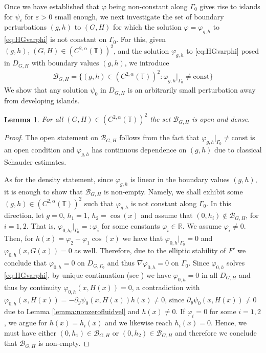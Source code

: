 \documentclass[11pt,reqno]{amsproc}
\newcommand{\R}{\mathbb{R}}
\newcommand{\ve}{\varepsilon}
\numberwithin{equation}{section}
\numberwithin{theorem}{section}
\numberwithin{prop}{section}
\numberwithin{cor}{section}
\newtheorem{lemma}{Lemma}
\numberwithin{lemma}{section}
\theoremstyle{remark}
\theoremstyle{definition}
\begin{document}
Once we have established that $\varphi$ being non-constant along $\Gamma_0$ gives rise to islands for $\psi_\ve$ for $\ve>0$ small enough, we next investigate the set of boundary perturbations $(g,h)$ to $(G,H)$ for which the solution $\varphi=\varphi_{g,h}$ to \eqref{eq:HGvarphi} is not constant on $\Gamma_0$. For this, given $(g,h),\, (G,H)\in (C^{2,\alpha}(\mathbb{T}))^2$, and the solution $\varphi_{g,h}$ to \eqref{eq:HGvarphi} posed in $D_{G,H}$ with boundary values $(g,h)$, we introduce
\begin{align*}
\mathcal{B}_{G,H} = \lbrace (g,h)\in (C^{2,\alpha}(\mathbb{T}))^2 : \varphi_{g,h}|_{\Gamma_0}\neq \text{const}\rbrace
\end{align*}
We show that any solution $\psi_0$ in $D_{G,H}$ is an arbitrarily small perturbation away from developing islands.

\begin{lemma}\label{lemma:BGHdense}
For all $(G,H)\in (C^{2,\alpha}(\mathbb{T}))^2$ the set $\mathcal{B}_{G,H}$ is open and dense.
\end{lemma}

\begin{proof}
The open statement on $\mathcal{B}_{G,H}$ follows from the fact that $\varphi_{g,h}|_{\Gamma_0}\neq \text{const}$ is an open condition and $\varphi_{g,h}$ has continuous dependence on $(g,h)$ due to classical Schauder estimates.

As for the density statement, since $\varphi_{g,h}$ is linear in the boundary values $(g,h)$, it is enough to show that $\mathcal{B}_{G,H}$ is non-empty. Namely, we shall exhibit some $(g,h)\in (C^{2,\alpha}(\mathbb{T}))^2$ such that $\varphi_{g,h}$ is not constant along $\Gamma_0$. In this direction, let $g=0$, $h_1=1$, $h_2=\cos(x)$ and assume that $(0,h_i)\not \in \mathcal{B}_{G,H}$, for $i=1,2$.  That is, $\varphi_{0,h_i}|_{\Gamma_0}=:\varphi_i$ for some constants $\varphi_i\in \R$. We assume $\varphi_i\neq 0$. Then, for $h(x)=\varphi_2-\varphi_1\cos(x)$ we have that $\varphi_{0,h}|_{\Gamma_0}=0$ and $\varphi_{0,h}(x,G(x))=0$ as well. Therefore, due to the elliptic stability of $F'$ we conclude that $\varphi_{0,h}=0$ on $D_{G,\Gamma_0}$ and thus $\nabla\varphi_{0,h}=0$ on $\Gamma_0$. Since $\varphi_{0,h}$ solves \eqref{eq:HGvarphi}, by unique continuation (see \cite{nadirashvili1986uniqueness}) we have $\varphi_{0,h}=0$ in all $D_{G,H}$ and thus by continuity $\varphi_{0,h}(x,H(x))=0$, a contradiction with $\varphi_{0,h}(x,H(x)) = -\partial_y\psi_0(x,H(x))h(x)\neq 0$, since $\partial_y\psi_0(x,H(x))\neq 0$ due to Lemma \ref{lemma:nonzerofluidvel} and $h(x)\neq 0$. If $\varphi_i=0$ for some $i=1,2$, we argue for $h(x)=h_i(x)$ and we likewise reach $h_i(x)=0$. Hence, we must have either $(0,h_1)\in \mathcal{B}_{G,H}$ or $(0,h_2)\in \mathcal{B}_{G,H}$ and therefore we conclude that $\mathcal{B}_{G,H}$ is non-empty.
\end{proof}
\end{document}
